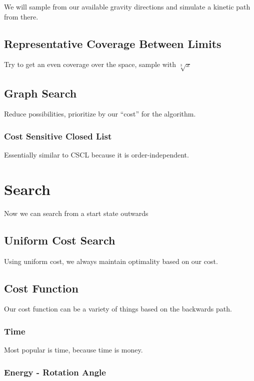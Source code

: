 We will sample from our available gravity directions and simulate a kinetic path from there.


	\subsection{Representative Coverage Between Limits}

Try to get an even coverage over the space, sample with $\sqrt[3]{x}$


	\subsection{Graph Search}

Reduce possibilities, prioritize by our ``cost'' for the algorithm.

		\subsubsection{Cost Sensitive Closed List}

Essentially similar to CSCL because it is order-independent.

\section{Search}

Now we can search from a start state outwards

	\subsection{Uniform Cost Search}

Using uniform cost, we always maintain optimality based on our cost.

	\subsection{Cost Function}

Our cost function can be a variety of things based on the backwards path.

		\subsubsection{Time}

Most popular is time, because time is money.

		\subsubsection{Energy - Rotation Angle}

